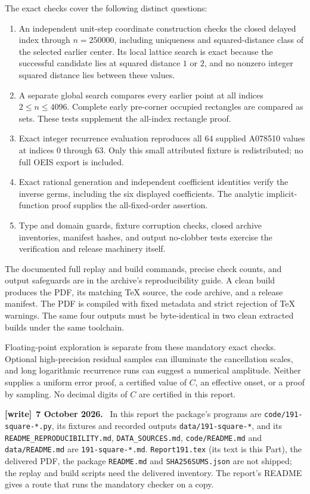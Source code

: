 \documentclass[11pt]{article}
\theoremstyle{remark}\newtheorem{remark}[theorem]{Remark}
\newcommand{\file}[1]{\nolinkurl{#1}}
\newenvironment{writenote}[1][]{\par\smallskip\begingroup\small
 \noindent\textbf{[write]}\if\relax\detokenize{#1}\relax\else~\textbf{#1.}\fi\ }%
 {\par\endgroup\smallskip}
\begin{document}
The exact checks cover the following distinct questions:
\begin{enumerate}
\item An independent unit-step coordinate construction checks the closed delayed index through $n=250000$, including uniqueness and squared-distance class of the selected earlier center. Its local lattice search is exact because the successful candidate lies at squared distance $1$ or $2$, and no nonzero integer squared distance lies between these values.
\item A separate global search compares every earlier point at all indices $2\le n\le4096$. Complete early pre-corner occupied rectangles are compared as sets. These tests supplement the all-index rectangle proof.
\item Exact integer recurrence evaluation reproduces all $64$ supplied A078510 values at indices $0$ through $63$. Only this small attributed fixture is redistributed; no full OEIS export is included.
\item Exact rational generation and independent coefficient identities verify the inverse germs, including the six displayed coefficients. The analytic implicit-function proof supplies the all-fixed-order assertion.
\item Type and domain guards, fixture corruption checks, closed archive inventories, manifest hashes, and output no-clobber tests exercise the verification and release machinery itself.
\end{enumerate}
The documented full replay and build commands, precise check counts, and output safeguards are in the archive's reproducibility guide. A clean build produces the PDF, its matching TeX source, the code archive, and a release manifest. The PDF is compiled with fixed metadata and strict rejection of TeX warnings. The same four outputs must be byte-identical in two clean extracted builds under the same toolchain.

Floating-point exploration is separate from these mandatory exact checks. Optional high-precision residual samples can illuminate the cancellation scales, and long logarithmic recurrence runs can suggest a numerical amplitude. Neither supplies a uniform error proof, a certified value of $C$, an effective onset, or a proof by sampling. No decimal digits of $C$ are certified in this report.

\begin{writenote}[7 October 2026]
In this report the package's programs are \file{code/191-square-*.py}, its fixtures and recorded outputs \file{data/191-square-*}, and its \file{README_REPRODUCIBILITY.md}, \file{DATA_SOURCES.md}, \file{code/README.md} and \file{data/README.md} are \file{191-square-*.md}. \file{Report191.tex} (its text is this Part), the delivered PDF, the package \file{README.md} and \file{SHA256SUMS.json} are not shipped; the replay and build scripts need the delivered inventory. The report's README gives a route that runs the mandatory checker on a copy.
\end{writenote}
\end{document}
